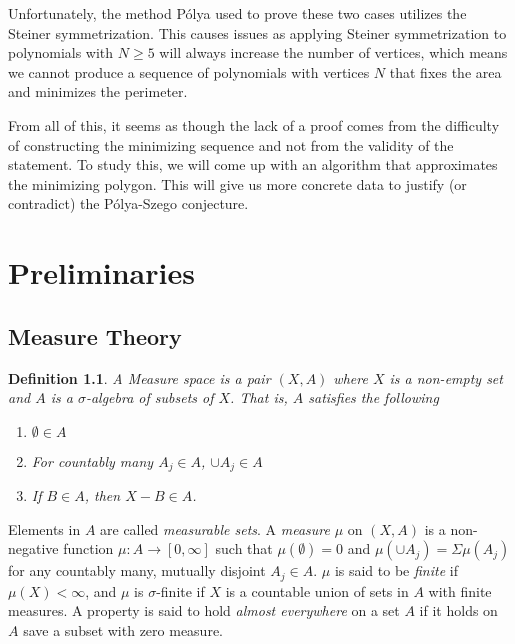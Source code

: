 \documentclass[12pt]{report}
\newtheorem{definition}{Definition}
\numberwithin{definition}{section}
\begin{document}

Unfortunately, the method Pólya used to prove these two cases utilizes the Steiner symmetrization.
This causes issues as applying Steiner symmetrization to polynomials with $N \geq 5$ will always increase the number of vertices, which means we cannot produce a sequence of polynomials with vertices $N$ that fixes the area and minimizes the perimeter.

From all of this, it seems as though the lack of a proof comes from the difficulty of constructing the minimizing sequence and not from the validity of the statement.
To study this, we will come up with an algorithm that approximates the minimizing polygon.
This will give us more concrete data to justify (or contradict) the Pólya-Szego conjecture.

\break


\chapter {Preliminaries}

\break


\section{Measure Theory}

\begin{definition}
  A Measure space is a pair $(X,A)$ where $X$ is a non-empty set and $A$ is a $\sigma$-algebra of subsets of $X$.
  That is, $A$ satisfies the following
  \begin{enumerate}
    \item $\emptyset \in A$
    \item For countably many $A_{j} \in A$, $\cup A_{j} \in A$ 
    \item If $B \in A$, then $X - B \in A$.
  \end{enumerate}
\end{definition}

Elements in $A$ are called \textit{measurable sets}.
A \textit{measure}  $\mu$ on $(X,A)$ is a non-negative function $ \mu : A \to [0,\infty] $ such that $\mu(\emptyset) = 0$ and $\mu(\cup A_{j}) = \Sigma \mu(A_{j})$ for any countably many, mutually disjoint $A_{j} \in A$.
$\mu$ is said to be  \textit{finite} if $\mu(X) < \infty$, and $\mu$ is $\sigma$-finite if $X$ is a countable union of sets in $A$ with finite measures.
A property is said to hold \textit{almost everywhere} on a set $A$ if it holds on $A$ save a subset with zero measure.
\end{document}
